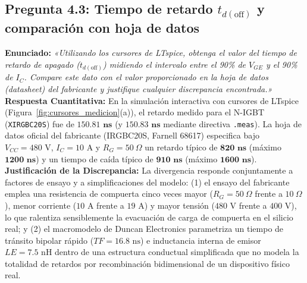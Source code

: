 \documentclass[11pt,a4paper]{article}
\begin{document}
\subsection{Pregunta 4.3: Tiempo de retardo $t_{d(\text{off})}$ y comparación con hoja de datos}
\textbf{Enunciado:} \textit{«Utilizando los cursores de LTspice, obtenga el valor del tiempo de retardo de apagado ($t_{d(\text{off})}$) midiendo el intervalo entre el 90\% de $V_{GE}$ y el 90\% de $I_C$. Compare este dato con el valor proporcionado en la hoja de datos (datasheet) del fabricante y justifique cualquier discrepancia encontrada.»}\\
\textbf{Respuesta Cuantitativa:} En la simulación interactiva con cursores de LTspice (Figura~\ref{fig:cursores_medicion}(a)), el retardo medido para el N-IGBT (\texttt{XIRGBC20S}) fue de $\bm{150.81\text{ ns}}$ (y $\bm{150.83\text{ ns}}$ mediante directiva \texttt{.meas}). La hoja de datos oficial del fabricante (IRGBC20S, Farnell 68617) especifica bajo $V_{CC} = 480\text{ V}$, $I_C = 10\text{ A}$ y $R_G = 50\ \Omega$ un retardo típico de $\bm{820\text{ ns}}$ (máximo $\bm{1200\text{ ns}}$) y un tiempo de caída típico de $\bm{910\text{ ns}}$ (máximo $\bm{1600\text{ ns}}$).\\
\textbf{Justificación de la Discrepancia:} La divergencia responde conjuntamente a factores de ensayo y a simplificaciones del modelo: (1) el ensayo del fabricante emplea una resistencia de compuerta cinco veces mayor ($R_G = 50\ \Omega$ frente a $10\ \Omega$), menor corriente ($10\text{ A}$ frente a $19\text{ A}$) y mayor tensión ($480\text{ V}$ frente a $400\text{ V}$), lo que ralentiza sensiblemente la evacuación de carga de compuerta en el silicio real; y (2) el macromodelo de Duncan Electronics parametriza un tiempo de tránsito bipolar rápido ($TF = 16.8\text{ ns}$) e inductancia interna de emisor $LE = 7.5\text{ nH}$ dentro de una estructura conductual simplificada que no modela la totalidad de retardos por recombinación bidimensional de un dispositivo físico real.
\end{document}
